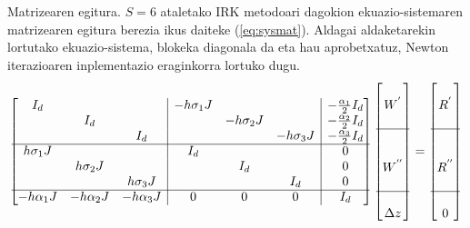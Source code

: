 Matrizearen egitura. $S=6$ ataletako IRK metodoari dagokion ekuazio-sistemaren matrizearen egitura berezia ikus daiteke (\ref{eq:sysmat}). Aldagai aldaketarekin lortutako ekuazio-sistema, blokeka diagonala da eta hau aprobetxatuz, Newton iterazioaren inplementazio eraginkorra lortuko dugu.    
\begin{equation}
\label{eq:sysmat}
\begin{bmatrix}
 I_d        &             &                     & \multicolumn{1}{|c}{-h\sigma_1 J} &            &                  &\multicolumn{1}{|c}{-\frac{\alpha_1}{2} I_d}\\
            & I_d         &                     & \multicolumn{1}{|c}{}           & -h\sigma_2 J &                
 &\multicolumn{1}{|c}{-\frac{\alpha_2}{2} I_d}\\
            &             & I_d                 & \multicolumn{1}{|c}{}           &            & -h\sigma_3 J  
 &\multicolumn{1}{|c}{-\frac{\alpha_3}{2} I_d}\\\cline{1-7}    
h\sigma_1 J &             &                     & \multicolumn{1}{|c}{I_d}        &            &            
 &\multicolumn{1}{|c}{0}\\
            & h\sigma_2 J &                     & \multicolumn{1}{|c}{}           &  I_d       &             
 &\multicolumn{1}{|c}{0}\\
            &             &  h\sigma_3 J        & \multicolumn{1}{|c}{}           &            &  I_d        
 &\multicolumn{1}{|c}{0}\\\cline{1-7}
 -h\alpha_1 J       & -h\alpha_2 J              &  -h\alpha_3 J                    & \multicolumn{1}{|c}{$0$}        &  $0$       &  $0$         
 &\multicolumn{1}{|c}{ I_d}\\
\end{bmatrix}
\begin{bmatrix}
         \\
 W^{'} \\
    \\
\cline{1-1} \\
    \\
 W^{''}   \\
    \\
    \cline{1-1} \\
 \Delta z  \\
\end{bmatrix}=
\begin{bmatrix}
         \\
 R^{'} \\
    \\
\cline{1-1} \\
    \\
 R^{''}   \\
    \\
    \cline{1-1} \\
 0  \\
\end{bmatrix}
\end{equation} 

